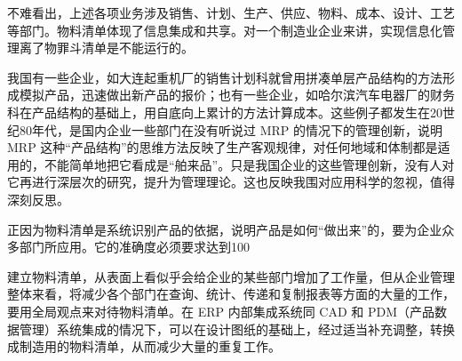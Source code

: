     不难看出，上述各项业务涉及销售、计划、生产、供应、物料、成本、设计、工艺等部门。物料清单体现了信息集成和共享。对一个制造业企业来讲，实现信息化管理离了物罪斗清单是不能运行的。

    我国有一些企业，如大连起重机厂的销售计划科就曾用拼凑单层产品结构的方法形成模拟产品，迅速做出新产品的报价；也有一些企业，如哈尔滨汽车电器厂的财务科在产品结构的基础上，用自底向上累计的方法计算成本。这些例子都发生在20世纪80年代，是国内企业一些部门在没有听说过 MRP 的情况下的管理创新，说明 MRP 这种“产品结构”的思维方法反映了生产客观规律，对任何地域和体制都是适用的，不能简单地把它看成是“舶来品”。只是我国企业的这些管理创新，没有人对它再进行深层次的研究，提升为管理理论。这也反映我围对应用科学的忽视，值得深刻反思。

    正因为物料清单是系统识别产品的依据，说明产品是如何“做出来”的，要为企业众多部门所应用。它的准确度必须要求达到100%

    建立物料清单，从表面上看似乎会给企业的某些部门增加了工作量，但从企业管理整体来看，将减少各个部门在查询、统计、传递和复制报表等方面的大量的工作，要用全局观点来对待物料清单。在 ERP 内部集成系统同 CAD 和 PDM（产品数据管理）系统集成的情况下，可以在设计图纸的基础上，经过适当补充调整，转换成制造用的物料清单，从而减少大量的重复工作。
